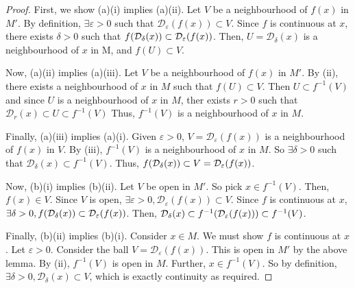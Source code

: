 \begin{proof}
	First, we show (a)(i) implies (a)(ii).
	Let \( V \) be a neighbourhood of \( f(x) \) in \( M' \).
	By definition, \( \exists \varepsilon > 0 \) such that \( \mathcal D_\varepsilon(f(x)) \subset V \).
	Since \( f \) is continuous at \( x \), there exists \( \delta > 0 \) such that \( f\qty(\mathcal D_\delta(x)) \subset \mathcal D_\varepsilon(f(x)) \).
	Then, \( U = \mathcal D_\delta(x) \) is a neighbourhood of \( x \) in M, and \( f(U) \subset V \).

	Now, (a)(ii) implies (a)(iii).
	Let \( V \) be a neighbourhood of \( f(x) \) in \( M' \).
	By (ii), there exists a neighbourhood of \( x \) in \( M \) such that \( f(U) \subset V \).
	Then \( U \subset f^{-1}(V) \) and since \( U \) is a neighbourhood of \( x \) in \( M \), ther exists \( r > 0 \) such that \( \mathcal D_r(x) \subset U \subset f^{-1}(V) \)
	Thus, \( f^{-1}(V) \) is a neighbourhood of \( x \) in \( M \).

	Finally, (a)(iii) implies (a)(i).
	Given \( \varepsilon > 0 \), \( V = \mathcal D_\varepsilon(f(x)) \) is a neighbourhood of \( f(x) \) in \( V \).
	By (iii), \( f^{-1}(V) \) is a neighbourhood of \( x \) in \( M \).
	So \( \exists \delta > 0 \) such that \( \mathcal D_\delta(x) \subset f^{-1}(V) \).
	Thus, \( f\qty(\mathcal D_\delta(x)) \subset V = \mathcal D_\varepsilon(f(x)) \).

	Now, (b)(i) implies (b)(ii).
	Let \( V \) be open in \( M' \).
	So pick \( x \in f^{-1}(V) \).
	Then, \( f(x) \in V \).
	Since \( V \) is open, \( \exists \varepsilon > 0, \mathcal D_\varepsilon(f(x)) \subset V \).
	Since \( f \) is continuous at \( x \), \( \exists \delta > 0, f\qty(\mathcal D_\delta(x)) \subset \mathcal D_\varepsilon(f(x)) \).
	Then, \( \mathcal D_\delta(x) \subset f^{-1}\qty(\mathcal D_\varepsilon(f(x))) \subset f^{-1}(V) \).

	Finally, (b)(ii) implies (b)(i).
	Consider \( x \in M \).
	We must show \( f \) is continuous at \( x \).
	Let \( \varepsilon > 0 \).
	Consider the ball \( V = \mathcal D_\varepsilon(f(x)) \).
	This is open in \( M' \) by the above lemma.
	By (ii), \( f^{-1}(V) \) is open in \( M \).
	Further, \( x \in f^{-1}(V) \).
	So by definition, \( \exists \delta > 0, \mathcal D_\delta(x) \subset V \), which is exactly continuity as required.
\end{proof}

